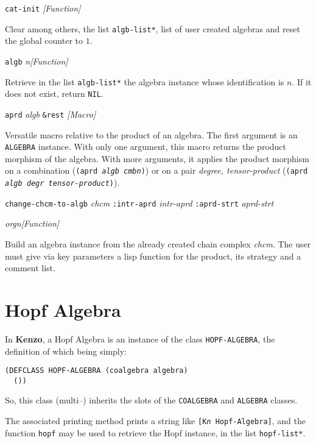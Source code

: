 {\parindent=0mm
{\leftskip=5mm
{\tt cat-init} \hfill {\em [Function]} \par}
{\leftskip=15mm
Clear among others, the list {\tt *algb-list*}, list of user created algebras  and reset
the global counter to $1$. \par}
{\leftskip=5mm
{\tt algb} {\em n}\hfill {\em [Function]} \par}
{\leftskip=15mm
Retrieve in the list {\tt *algb-list*} the algebra  instance whose identification is $n$.
If it does not exist, return {\tt NIL}. \par}
{\leftskip=5mm
{\tt aprd} {\em algb} {\tt \&rest} \hfill {\em [Macro]} \par}
{\leftskip=15mm
Versatile macro relative to the product of an algebra. The first argument is an {\tt ALGEBRA}
instance. With only one argument, this macro returns the product morphism of the algebra.
With more arguments, it applies the product morphism on a combination ({\tt (aprd {\em algb cmbn})})
or on a pair {\em degree, tensor-product} ({\tt (aprd {\em algb degr tensor-product})}). \par}
{\leftskip=5mm
{\tt change-chcm-to-algb} {\em chcm} {\tt :intr-aprd} {\em intr-aprd} {\tt :aprd-strt} {\em aprd-strt} \par
\hspace* {10mm}{\tt :orgn} {\em orgn}\hfill {\em [Function]} \par}
{\leftskip=15mm
Build an algebra instance from the already created chain complex {\em chcm}. The user must give via key
parameters a lisp function for the product, its strategy and a comment list. \par}
}

\section {Hopf Algebra}

In {\bf Kenzo}, a Hopf Algebra is an instance
of the class {\tt HOPF-ALGEBRA}, the definition of which being simply:
{\footnotesize\begin{verbatim}
(DEFCLASS HOPF-ALGEBRA (coalgebra algebra)
  ())
\end{verbatim}}
So, this class (multi--) inherits the slots of the {\tt COALGEBRA} and {\tt ALGEBRA} classes.
\par
The  associated printing method prints a string like
{\tt [K{\em n} Hopf-Algebra]},  and the function {\tt hopf} may be used to retrieve the
Hopf instance, in the list {\tt *hopf-list*}.

